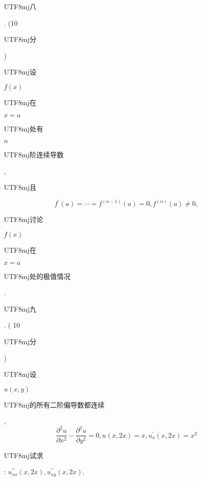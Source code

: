 \documentclass[10pt]{article}
\begin{document}
\begin{CJK}{UTF8}{mj}八\end{CJK}. (10 \begin{CJK}{UTF8}{mj}分\end{CJK}) \begin{CJK}{UTF8}{mj}设\end{CJK} $f(x)$ \begin{CJK}{UTF8}{mj}在\end{CJK} $x=a$ \begin{CJK}{UTF8}{mj}处有\end{CJK} $n$ \begin{CJK}{UTF8}{mj}阶连续导数\end{CJK}, \begin{CJK}{UTF8}{mj}且\end{CJK}
$$
f^{\prime}(a)=\cdots=f^{(n-1)}(a)=0, f^{(n)}(a) \neq 0,
$$
\begin{CJK}{UTF8}{mj}讨论\end{CJK} $f(x)$ \begin{CJK}{UTF8}{mj}在\end{CJK} $x=a$ \begin{CJK}{UTF8}{mj}处的极值情况\end{CJK}. \begin{CJK}{UTF8}{mj}九\end{CJK}. ( 10 \begin{CJK}{UTF8}{mj}分\end{CJK}) \begin{CJK}{UTF8}{mj}设\end{CJK} $u(x, y)$ \begin{CJK}{UTF8}{mj}的所有二阶偏导数都连续\end{CJK},
$$
\frac{\partial^{2} u}{\partial x^{2}}-\frac{\partial^{2} u}{\partial y^{2}}=0, u(x, 2 x)=x, u_{x}^{\prime}(x, 2 x)=x^{2}
$$
\begin{CJK}{UTF8}{mj}试求\end{CJK}: $u_{x x}^{\prime \prime}(x, 2 x), u_{x y}^{\prime \prime}(x, 2 x)$.
\end{document}

